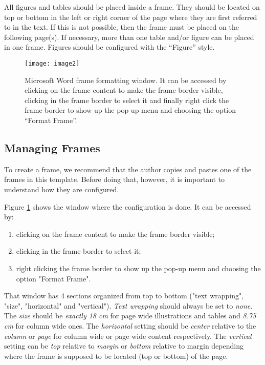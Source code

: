 \documentclass[final]{imeko_acta}
\begin{document}
All figures and tables should be placed inside a frame. They
should be located on top or bottom in the left or right corner
of the page where they are first referred to in the text. If this is
not possible, then the frame must be placed on the following
page(s). If necessary, more than one table and/or figure can be
placed in one frame. Figures should be configured with the ``Figure'' style.

\begin{figure}[!t]
	\centering
	\texttt{[image: image2]}
	\caption{Microsoft Word frame formatting window. It can be accessed by clicking on the frame content to make the frame border visible, clicking in the frame border to select it and finally right click the frame border to show up the pop-up menu and choosing the option ``Format Frame''.}
	\label{fig:image2}
\end{figure}

\subsection{Managing Frames}

To create a frame, we recommend that the author copies and pastes one of the frames in this template. Before doing that, however, it is important to understand how they are configured. 

Figure \ref{fig:image2} shows the window where the configuration is done. It can be accessed by: 
\begin{enumerate}
	\item clicking on the frame content to make the frame border visible;
	\item clicking in the frame border to select it;
	\item right clicking the frame border to show up the pop-up menu and choosing the option "Format Frame".
\end{enumerate}


That window has 4 sections organized from top to bottom ("text wrapping", "size", "horizontal" and "vertical"). 
\emph{Text wrapping} should always be set to \emph{none}. The \emph{size} should be \emph{exactly 18 cm} for page wide illustrations and tables and 
\emph{8.75 cm} for column wide ones. The \emph{horizontal} setting should be \emph{center} relative to the \emph{column} or \emph{page} for column wide or page wide content respectively. The \emph{vertical} setting can be \emph{top} relative to \emph{margin} or \emph{bottom} relative to margin depending where the frame is supposed to be located (top or bottom) of the page.
\end{document}
